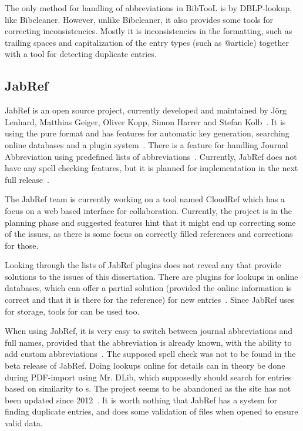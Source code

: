 The only method for handling of abbreviations in BibTooL is by
DBLP-lookup, like Bibcleaner.  However, unlike Bibcleaner, it also
provides some tools for correcting inconsistencies.  Mostly it is
inconsistencies in the formatting, such as trailing spaces and
capitalization of the entry types (such as @article) together with a
tool for detecting duplicate entries.

\subsection{JabRef}
JabRef is an open source project, currently developed and maintained
by Jörg Lenhard, Matthias Geiger, Oliver Kopp, Simon Harrer and Stefan
Kolb~\cite{jabref_developers}.  It is using the pure {\bibtex} format
and has features for automatic key generation, searching online
databases and a plugin system~\cite{jabref_features}.  There is a
feature for handling Journal Abbreviation using predefined lists of
abbreviations~\cite{jabref_abbreviations}.  Currently, JabRef does not
have any spell checking features, but it is planned for implementation
in the next full release~\cite{jabref_spellchecker}.

The JabRef team is currently working on a tool named CloudRef which
has a focus on a web based interface for collaboration.  Currently,
the project is in the planning phase and suggested features hint that
it might end up correcting some of the issues, as there is some focus
on correctly filled {\bibtex} references and corrections for those.

Looking through the lists of JabRef plugins does not reveal any that
provide solutions to the issues of this dissertation.  There are
plugins for lookups in online databases, which can offer a partial
solution (provided the online information is correct and that it is
there for the reference) for new entries~\cite{jabref_resources}.
Since JabRef uses {\bibtex} for storage, tools for {\bibtex} can be
used too.

When using JabRef, it is very easy to switch between journal
abbreviations and full names, provided that the abbreviation is
already known, with the ability to add custom
abbreviations~\cite{jabref_abbreviations}.  The supposed spell check
was not to be found in the beta release of JabRef.  Doing lookups
online for details can in theory be done during PDF-import using
Mr. DLib, which supposedly should search for entries based on
similarity to s.  The project seems to be abandoned as the
site has not been updated since
2012~\cite{jabref_mrdlib_notice,jabref_mrdlib}.  It is worth nothing
that JabRef has a system for finding duplicate entries, and does some
validation of {\bibtex} files when opened to ensure valid data.

